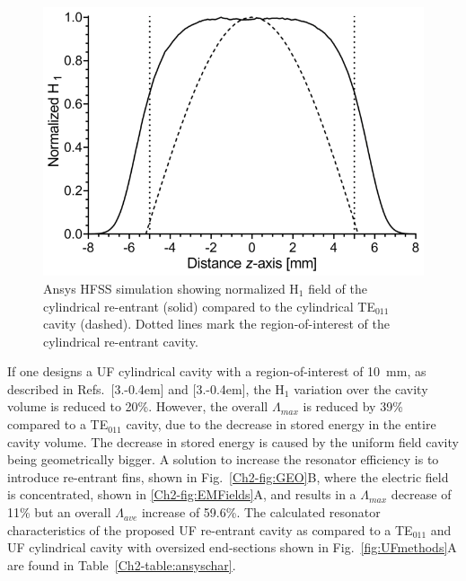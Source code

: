 \begin{figure}[htb]\centering
 \includegraphics{Kapitel/Ch2-Images/02-TE01UProfile.eps}
 \caption[Ansys HFSS simulation of normalized H$_1$ field.]{Ansys HFSS simulation showing normalized H$_1$ field of the cylindrical re-entrant \cylTE{} (solid) compared to the cylindrical TE$_{\text{011}}$ cavity (dashed). Dotted lines mark the region-of-interest of the cylindrical re-entrant \cylTE{} cavity. }
 \label{Ch2-fig:normb1}
\end{figure}

If one designs a UF cylindrical \cylTE{} cavity with a region-of-interest of 10~mm, as described in Refs.~[3.\kern-0.4em] and [3.\kern-0.4em], the H$_1$ variation over the cavity volume is reduced to 20\%. However, the overall $\Lambda_{max}$ is reduced by 39\% compared to a TE$_{011}$ cavity, due to the decrease in stored energy in the entire cavity volume. The decrease in stored energy is caused by the uniform field cavity being geometrically bigger. A solution to increase the resonator efficiency is to introduce re-entrant fins, shown in Fig.~\ref{Ch2-fig:GEO}B, where the electric field is concentrated, shown in \ref{Ch2-fig:EMFields}A, and results in a $\Lambda_{max}$ decrease of 11\% but an overall $\Lambda_{ave}$ increase of 59.6\%. The calculated resonator characteristics of the proposed UF re-entrant \cylTE{} cavity as compared to a TE$_{011}$ and UF cylindrical \cylTE{} cavity with oversized end-sections shown in Fig.~\ref{fig:UFmethods}A are found in Table~\ref{Ch2-table:ansyschar}.

